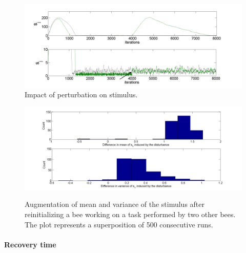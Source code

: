 \begin{figure}[ht!]
\begin{centering}
\includegraphics[scale=0.4]{figures/Figure7.png}\caption{Impact of perturbation on stimulus.}
\label{fig:figure3}
\par\end{centering}

\centering{}
\end{figure}


\begin{figure}[ht!]
\begin{centering}
\includegraphics[scale=0.35]{figures/Augmentation2_2}
\label{fig:figure4}
\par\end{centering}

\begin{centering}
\caption{Augmentation of mean and variance of the stimulus after reinitializing a bee working on a task performed by two other bees. The plot represents a superposition of 500 consecutive runs.}

\par\end{centering}

\end{figure}



\paragraph{Recovery time}


